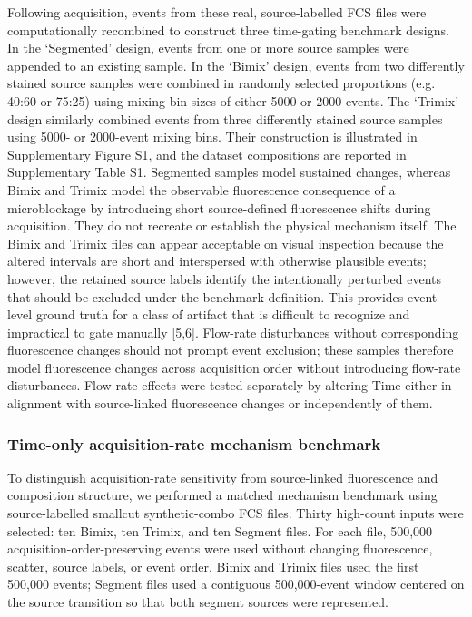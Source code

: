 \documentclass[ASNA]{latex/wiley/USG}
\begin{document}
Following acquisition, events from these real, source-labelled FCS files
were computationally recombined to construct three time-gating benchmark
designs. In the `Segmented' design, events from one or more source
samples were appended to an existing sample. In the `Bimix' design,
events from two differently stained source samples were combined in
randomly selected proportions (e.g. 40:60 or 75:25) using mixing-bin
sizes of either 5000 or 2000 events. The `Trimix' design similarly
combined events from three differently stained source samples using
5000- or 2000-event mixing bins. Their construction is illustrated in
Supplementary Figure S1, and the dataset compositions are reported in
Supplementary Table S1. Segmented samples model sustained changes,
whereas Bimix and Trimix model the observable fluorescence consequence
of a microblockage by introducing short source-defined fluorescence
shifts during acquisition. They do not recreate or establish the
physical mechanism itself. The Bimix and Trimix files can appear
acceptable on visual inspection because the altered intervals are short
and interspersed with otherwise plausible events; however, the retained
source labels identify the intentionally perturbed events that should be
excluded under the benchmark definition. This provides event-level
ground truth for a class of artifact that is difficult to recognize and
impractical to gate manually {[}5,6{]}. Flow-rate disturbances without
corresponding fluorescence changes should not prompt event exclusion;
these samples therefore model fluorescence changes across acquisition
order without introducing flow-rate disturbances. Flow-rate effects were
tested separately by altering Time either in alignment with
source-linked fluorescence changes or independently of them.

\subsubsection{Time-only acquisition-rate mechanism
benchmark}\label{time-only-acquisition-rate-mechanism-benchmark}

To distinguish acquisition-rate sensitivity from source-linked
fluorescence and composition structure, we performed a matched mechanism
benchmark using source-labelled smallcut synthetic-combo FCS files.
Thirty high-count inputs were selected: ten Bimix, ten Trimix, and ten
Segment files. For each file, 500,000 acquisition-order-preserving
events were used without changing fluorescence, scatter, source labels,
or event order. Bimix and Trimix files used the first 500,000 events;
Segment files used a contiguous 500,000-event window centered on the
source transition so that both segment sources were represented.
\end{document}
